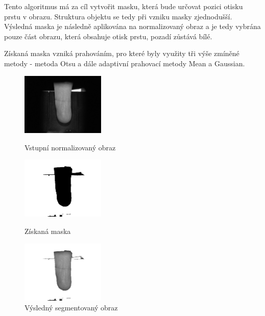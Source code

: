Tento algoritmus má za cíl vytvořit masku, která bude určovat pozici otisku prstu v obrazu. Struktura objektu se tedy při vzniku masky zjednodušší. Výsledná maska je následně aplikována na normalizovaný obraz a je tedy vybrána pouze část obrazu, která obsahuje otisk prstu, pozadí zůstává bílé.

Získaná maska vzniká prahováním, pro které byly využity tři výše zmíněné metody - metoda Otsu a dále adaptivní prahovací metody Mean a Gaussian.

\begin{figure}[!htbp]
  \begin{minipage}[b]{0.3\linewidth}
    \centering
    \includegraphics[width=150px]{obrazky-figures/live104norm.png}
    \caption{Vstupní normalizovaný obraz}
  \end{minipage}
  \hspace{0.3cm}
  \begin{minipage}[b]{0.3\linewidth}
    \centering
    \includegraphics[width=150px]{obrazky-figures/live104mask.png}
    \caption{Získaná maska}
  \end{minipage}
  \hspace{0.3cm}
    \begin{minipage}[b]{0.3\linewidth}
    \centering
    \includegraphics[width=150px]{obrazky-figures/live104segotsu.png}
    \caption{Výsledný segmentovaný obraz}
  \end{minipage}
\end{figure}

